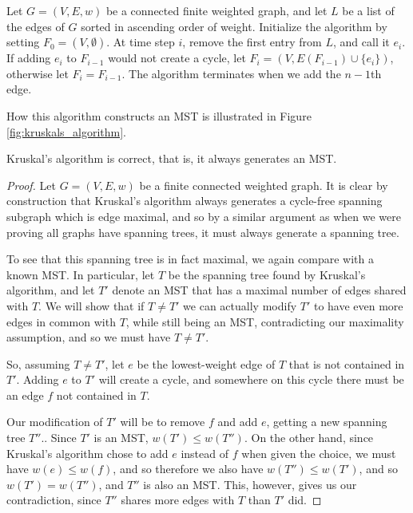 \documentclass[nobib]{tufte-handout}
\begin{document}
\begin{definition}
  Let $G = (V,E,w)$ be a connected finite weighted graph, and let $L$ be a list of the edges of $G$ sorted in ascending order of weight. Initialize the algorithm by setting $F_0 = (V, \emptyset)$. At time step $i$, remove the first entry from $L$, and call it $e_i$. If adding $e_i$ to $F_{i-1}$ would not create a cycle, let $F_i = (V, E(F_{i-1})\cup\{e_i\})$, otherwise let $F_i = F_{i-1}$. The algorithm terminates when we add the $n-1$th edge.

  How this algorithm constructs an MST is illustrated in Figure \ref{fig:kruskals_algorithm}.
\end{definition}

\begin{theorem}
  Kruskal's algorithm is correct, that is, it always generates an MST.

  \begin{proof}
    Let $G = (V,E,w)$ be a finite connected weighted graph. It is clear by construction that Kruskal's algorithm always generates a cycle-free spanning subgraph which is edge maximal, and so by a similar argument as when we were proving all graphs have spanning trees, it must always generate a spanning tree.

    To see that this spanning tree is in fact maximal, we again compare with a known MST. In particular, let $T$ be the spanning tree found by Kruskal's algorithm, and let $T'$ denote an MST that has a maximal number of edges shared with $T$. We will show that if $T \neq T'$ we can actually modify $T'$ to have even more edges in common with $T$, while still being an MST, contradicting our maximality assumption, and so we must have $T \neq T'$.

    So, assuming $T \neq T'$, let $e$ be the lowest-weight edge of $T$ that is not contained in $T'$. Adding $e$ to $T'$ will create a cycle, and somewhere on this cycle there must be an edge $f$ not contained in $T$.

    Our modification of $T'$ will be to remove $f$ and add $e$, getting a new spanning tree $T''$.. Since $T'$ is an MST, $w(T') \leq w(T'')$. On the other hand, since Kruskal's algorithm chose to add $e$ instead of $f$ when given the choice, we must have $w(e) \leq w(f)$, and so therefore we also have $w(T'') \leq w(T')$, and so $w(T') = w(T'')$, and $T''$ is also an MST. This, however, gives us our contradiction, since $T''$ shares more edges with $T$ than $T'$ did.
  \end{proof}
\end{theorem}
\end{document}
